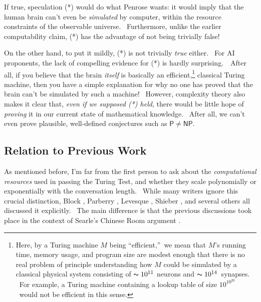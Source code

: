 \documentclass[11pt,onecolumn]{article}%
\begin{document}
If true, speculation (*) would do what Penrose wants: it would imply that the
human brain can't even be \textit{simulated} by computer, within the resource
constraints of the observable universe. \ Furthermore, unlike the earlier
computability claim, (*) has the advantage of not being trivially false!

On the other hand, to put it mildly, (*) is not trivially \textit{true}
either. \ For AI proponents, the lack of compelling evidence for (*) is hardly
surprising.\ \ After all, if you believe that the brain \textit{itself} is
basically an efficient,\footnote{Here, by a Turing machine $M$ being
\textquotedblleft efficient,\textquotedblright\ we mean that $M$'s running
time, memory usage, and program size are modest enough that there is no real
problem of principle understanding how $M$ could be simulated by a classical
physical system consisting of $\thicksim10^{11}$ neurons and $\thicksim
10^{14}$\ synapses. \ For example, a Turing machine containing a lookup table
of size $10^{10^{20}}$\ would not be efficient in this sense.} classical
Turing machine, then you have a simple explanation for why no one has proved
that the brain can't be simulated by such a machine! \ However, complexity
theory also makes it clear that, \textit{even if we supposed (*) held}, there
would be little hope of \textit{proving} it in our current state of
mathematical knowledge. \ After all, we can't even prove plausible,
well-defined conjectures such as $\mathsf{P}\neq\mathsf{NP}$.

\subsection{Relation to Previous Work\label{PREVWORK}}

As mentioned before, I'm far from the first person to ask about the
\textit{computational resources} used in passing the Turing Test, and whether
they scale polynomially or exponentially with the conversation length. \ While
many writers ignore this crucial distinction, Block \cite{block}, Parberry
\cite{parberry}, Levesque \cite{levesque}, Shieber \cite{shieber}, and several
others all discussed it explicitly. \ The main difference is that the previous
discussions took place in the context of Searle's Chinese Room argument
\cite{searle}.
\end{document}
